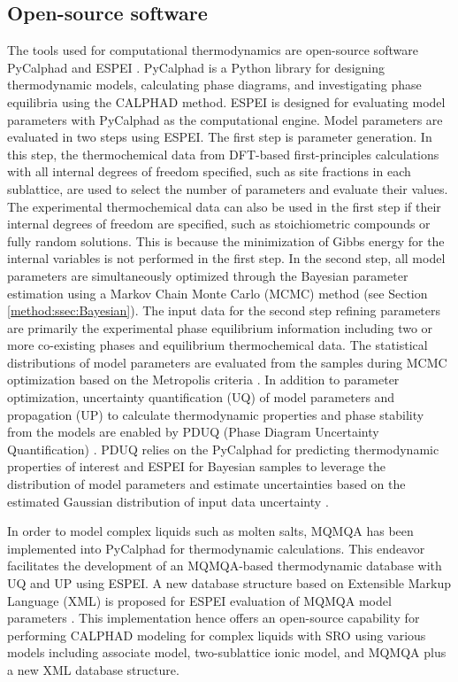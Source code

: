 \subsection{Open-source software} \label{method:ssec:tools}
The tools used for computational thermodynamics are open-source software PyCalphad \cite{otis2017pycalphad} and ESPEI \cite{bocklund2019espei}. PyCalphad \cite{otis2017pycalphad} is a Python library for designing thermodynamic models, calculating phase diagrams, and investigating phase equilibria using the CALPHAD method. ESPEI \cite{bocklund2019espei} is designed for evaluating model parameters with PyCalphad as the computational engine. Model parameters are evaluated in two steps using ESPEI. The first step is parameter generation. In this step, the thermochemical data from DFT-based first-principles calculations with all internal degrees of freedom specified, such as site fractions in each sublattice, are used to select the number of parameters and evaluate their values. The experimental thermochemical data can also be used in the first step if their internal degrees of freedom are specified, such as stoichiometric compounds or fully random solutions. This is because the minimization of Gibbs energy for the internal variables is not performed in the first step. In the second step, all model parameters are simultaneously optimized through the Bayesian parameter estimation using a Markov Chain Monte Carlo (MCMC) method \cite{bocklund2019espei} (see Section \ref{method:ssec:Bayesian}). The input data for the second step refining parameters are primarily the experimental phase equilibrium information including two or more co-existing phases and equilibrium thermochemical data. The statistical distributions of model parameters are evaluated from the samples during MCMC optimization based on the Metropolis criteria \cite{bocklund2019espei}. In addition to parameter optimization, uncertainty quantification (UQ) of model parameters and propagation (UP) to calculate thermodynamic properties and phase stability from the models are enabled by PDUQ (Phase Diagram Uncertainty Quantification) \cite{paulson2019quantified}. PDUQ relies on the PyCalphad for predicting thermodynamic properties of interest and ESPEI for Bayesian samples to leverage the distribution of model parameters and estimate uncertainties based on the estimated Gaussian distribution of input data uncertainty \cite{paulson2019quantified}. 

In order to model complex liquids such as molten salts, MQMQA has been implemented into PyCalphad for thermodynamic calculations. This endeavor facilitates the development of an MQMQA-based thermodynamic database with UQ and UP using ESPEI. A new database structure based on Extensible Markup Language (XML) is proposed for ESPEI evaluation of MQMQA model parameters \cite{palma2023thermodynamic}. This implementation hence offers an open-source capability for performing CALPHAD modeling for complex liquids with SRO using various models including associate model, two-sublattice ionic model, and MQMQA plus a new XML database structure.

